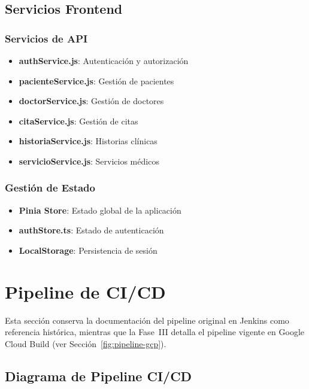 \documentclass[12pt,a4paper]{article}
\begin{document}
\subsection{Servicios Frontend}

\subsubsection{Servicios de API}
\begin{itemize}
    \item \textbf{authService.js}: Autenticación y autorización
    \item \textbf{pacienteService.js}: Gestión de pacientes
    \item \textbf{doctorService.js}: Gestión de doctores
    \item \textbf{citaService.js}: Gestión de citas
    \item \textbf{historiaService.js}: Historias clínicas
    \item \textbf{servicioService.js}: Servicios médicos
\end{itemize}

\subsubsection{Gestión de Estado}
\begin{itemize}
    \item \textbf{Pinia Store}: Estado global de la aplicación
    \item \textbf{authStore.ts}: Estado de autenticación
    \item \textbf{LocalStorage}: Persistencia de sesión
\end{itemize}

\section{Pipeline de CI/CD}

Esta sección conserva la documentación del pipeline original en Jenkins como referencia histórica, mientras que la Fase~III detalla el pipeline vigente en Google Cloud Build (ver Sección~\ref{fig:pipeline-gcp}).

\subsection{Diagrama de Pipeline CI/CD}
\end{document}

